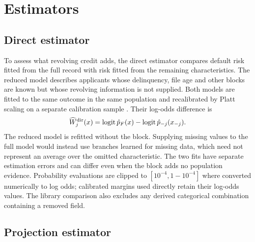\section{Estimators}\label{sec:estimation}

\subsection{Direct estimator}

To assess what revolving credit adds, the direct estimator compares default risk fitted from the full record with risk fitted from the remaining characteristics. The reduced model describes applicants whose delinquency, file age and other blocks are known but whose revolving information is not supplied. Both models are fitted to the same outcome in the same population and recalibrated by Platt scaling on a separate calibration sample \citep{platt}. Their log-odds difference is
\begin{equation}\label{eq:direct}
\widehat W_j^{\rm dir}(x)=\operatorname{logit}\hat p_F(x)-\operatorname{logit}\hat p_{-j}(x_{-j}).
\end{equation}
The reduced model is refitted without the block. Supplying missing values to the full model would instead use branches learned for missing data, which need not represent an average over the omitted characteristic. The two fits have separate estimation errors and can differ even when the block adds no population evidence. Probability evaluations are clipped to $[10^{-4},1-10^{-4}]$ where converted numerically to log odds; calibrated margins used directly retain their log-odds values. The library comparison also excludes any derived categorical combination containing a removed field.

\subsection{Projection estimator}

